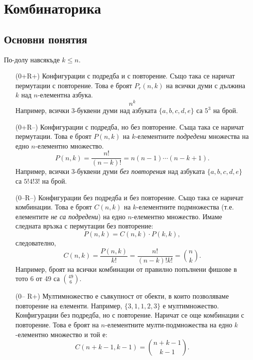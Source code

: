 \chapter{Комбинаторика}

\section{Основни понятия}

По-долу навсякъде $k \leq n$.
\begin{enumerate}
\item[(0+R+)]
  Конфигурации с подредба и с повторение.
  Също така се наричат пермутации с повторение.
  Това е броят $P_r(n,k)$ на всички думи с дължина $k$ над $n$-елементна азбука.
  \[n^k\]
  Например, всички 3-буквени думи над азбуката $\{a,b,c,d,e\}$ са $5^3$ на брой.
\item[(0+R--)]
  Конфигурации с подредба, но без повторение. 
  Съща така се наричат пермутации.
  Това е броят $P(n,k)$ на $k$-елементните {\em подредени} множества на едно $n$-елементно множество.
  \[P(n,k) = \frac{n!}{(n-k)!} = n(n-1)\cdots(n-k+1).\]
  Например, всички 3-буквени думи {\em без повторения} над азбуката $\{a,b,c,d,e\}$
  са $5!4!3!$ на брой.
\item[(0--R--)]
  Конфигурации без подредба и без повторение.
  Също така се наричат комбинации.
  Това е броят $C(n,k)$ на $k$-елементните подмножества (т.е. елементите {\em не са подредени}) на едно $n$-елементно множество.
  Имаме следната връзка с пермутации без повторение:
  \[P(n,k) = C(n,k)\cdot P(k,k),\] следователно,
  \[C(n,k) =  \frac{P(n,k)}{k!} = \frac{n!}{(n-k)!k!} = \binom{n}{k}.\]
  Например, броят на всички комбинации от правилно попълнени фишове в тото 6 от 49 са $\binom{49}{6}$.
\item[(0-- R+)]
  Мултимножество е съвкупност от обекти, в които позволяваме повторение на елементи.
  Например, $\{3,1,1,2,3\}$ е мултимножество.
  Конфигурации без подредба, но с повторение.
  Наричат се още комбинации с повторение.
  Това е броят на $n$-елементните мулти-подмножества на едно $k$-елементно множество
  и той е:
  \[C(n+k-1,k-1) = \binom{n+k-1}{k-1}.\]
\end{enumerate}

